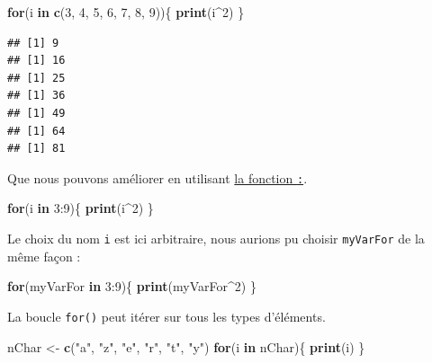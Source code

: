 \documentclass[twoside,symmetric]{book}
\newenvironment{Shaded}{}{}
\newcommand{\ControlFlowTok}[1]{\textbf{#1}}
\newcommand{\DecValTok}[1]{#1}
\newcommand{\KeywordTok}[1]{\textbf{#1}}
\newcommand{\NormalTok}[1]{#1}
\newcommand{\OperatorTok}[1]{#1}
\newcommand{\StringTok}[1]{#1}
\begin{document}
\begin{Shaded}
\begin{Highlighting}[]
\ControlFlowTok{for}\NormalTok{(i }\ControlFlowTok{in} \KeywordTok{c}\NormalTok{(}\DecValTok{3}\NormalTok{, }\DecValTok{4}\NormalTok{, }\DecValTok{5}\NormalTok{, }\DecValTok{6}\NormalTok{, }\DecValTok{7}\NormalTok{, }\DecValTok{8}\NormalTok{, }\DecValTok{9}\NormalTok{))\{}
  \KeywordTok{print}\NormalTok{(i}\OperatorTok{^}\DecValTok{2}\NormalTok{)}
\NormalTok{\}}
\end{Highlighting}
\end{Shaded}

\begin{verbatim}
## [1] 9
## [1] 16
## [1] 25
## [1] 36
## [1] 49
## [1] 64
## [1] 81
\end{verbatim}

Que nous pouvons améliorer en utilisant \protect\hyperlink{l0152points}{la fonction \texttt{:}}.

\begin{Shaded}
\begin{Highlighting}[]
\ControlFlowTok{for}\NormalTok{(i }\ControlFlowTok{in} \DecValTok{3}\OperatorTok{:}\DecValTok{9}\NormalTok{)\{}
  \KeywordTok{print}\NormalTok{(i}\OperatorTok{^}\DecValTok{2}\NormalTok{)}
\NormalTok{\}}
\end{Highlighting}
\end{Shaded}

Le choix du nom \texttt{i} est ici arbitraire, nous aurions pu choisir \texttt{myVarFor} de la même façon :

\begin{Shaded}
\begin{Highlighting}[]
\ControlFlowTok{for}\NormalTok{(myVarFor }\ControlFlowTok{in} \DecValTok{3}\OperatorTok{:}\DecValTok{9}\NormalTok{)\{}
  \KeywordTok{print}\NormalTok{(myVarFor}\OperatorTok{^}\DecValTok{2}\NormalTok{)}
\NormalTok{\}}
\end{Highlighting}
\end{Shaded}

La boucle \texttt{for()} peut itérer sur tous les types d'éléments.

\begin{Shaded}
\begin{Highlighting}[]
\NormalTok{nChar <-}\StringTok{ }\KeywordTok{c}\NormalTok{(}\StringTok{"a"}\NormalTok{, }\StringTok{"z"}\NormalTok{, }\StringTok{"e"}\NormalTok{, }\StringTok{"r"}\NormalTok{, }\StringTok{"t"}\NormalTok{, }\StringTok{"y"}\NormalTok{)}
\ControlFlowTok{for}\NormalTok{(i }\ControlFlowTok{in}\NormalTok{ nChar)\{}
  \KeywordTok{print}\NormalTok{(i)}
\NormalTok{\}}
\end{Highlighting}
\end{Shaded}
\end{document}
